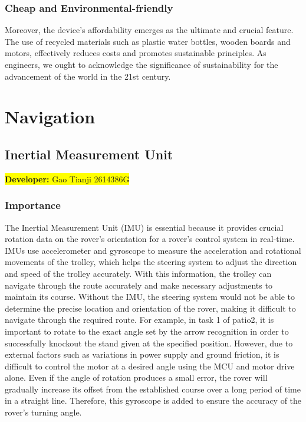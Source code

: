 \documentclass[12pt, a4paper, oneside]{report}
\begin{document}
\subsubsection{Cheap and Environmental-friendly}
Moreover, the device's affordability emerges as the ultimate and crucial feature. The use of recycled materials such as plastic water bottles, wooden boards and motors, effectively reduces costs and promotes sustainable principles. As engineers, we ought to acknowledge the significance of sustainability for the advancement of the world in the 21st century. 

\newpage
\section{Navigation}
	
\subsection{Inertial Measurement Unit}\label{sec:itm}
\colorbox{yellow}{\textbf{Developer:} Gao Tianji 2614386G}

\subsubsection{Importance}
The Inertial Measurement Unit (IMU) is essential because it provides crucial rotation data on the rover's orientation for a rover’s control system in real-time. IMUs use accelerometer and gyroscope to measure the acceleration and rotational movements of the trolley, which helps the steering system to adjust the direction and speed of the trolley accurately. With this information, the trolley can navigate through the route accurately and make necessary adjustments to maintain its course.
Without the IMU, the steering system would not be able to determine the precise location and orientation of the rover, making it difficult to navigate through the required route. For example, in task 1 of patio2, it is important to rotate to the exact angle set by the arrow recognition in order to successfully knockout the stand given at the specified position. However, due to external factors such as variations in power supply and ground friction, it is difficult to control the motor at a desired angle using the MCU and motor drive alone. Even if the angle of rotation produces a small error, the rover will gradually increase its offset from the established course over a long period of time in a straight line. Therefore, this gyroscope is added to ensure the accuracy of the rover's turning angle.
\end{document}
